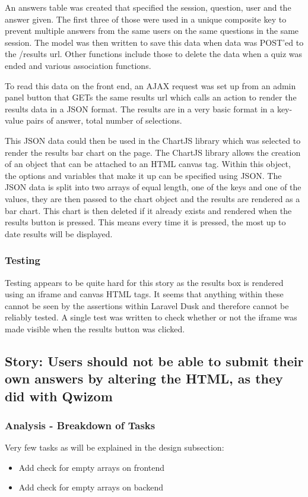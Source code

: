 An answers table was created that specified the session, question, user and the answer given. The first three of those were used in a unique composite key to prevent multiple answers from the same users on the same questions in the same session. The model was then written to save this data when data was POST'ed to the /results url. Other functions include those to delete the data when a quiz was ended and various association functions.

To read this data on the front end, an AJAX request was set up from an admin panel button that GETs the same results url which calls an action to render the results data in a JSON format. The results are in a very basic format in a key-value pairs of answer, total number of selections.

This JSON data could then be used in the ChartJS library which was selected to render the results bar chart on the page\cite{chartjs}. The ChartJS library allows the creation of an object that can be attached to an HTML canvas tag. Within this object, the options and variables that make it up can be specified using JSON. The JSON data is split into two arrays of equal length, one of the keys and one of the values, they are then passed to the chart object and the results are rendered as a bar chart. This chart is then deleted if it already exists and rendered when the results button is pressed. This means every time it is pressed, the most up to date results will be displayed. 
\subsubsection{Testing}
Testing appears to be quite hard for this story as the results box is rendered using an iframe and canvas HTML tags. It seems that anything within these cannot be seen by the assertions within Laravel Dusk and therefore cannot be reliably tested. A single test was written to check whether or not the iframe was made visible when the results button was clicked.
\newpage

\subsection{Story: Users should not be able to submit their own answers by altering the HTML, as they did with Qwizom}
\subsubsection{Analysis - Breakdown of Tasks}
Very few tasks as will be explained in the design subsection:
\begin{itemize}
	\item Add check for empty arrays on frontend
	\item Add check for empty arrays on backend
\end{itemize}
